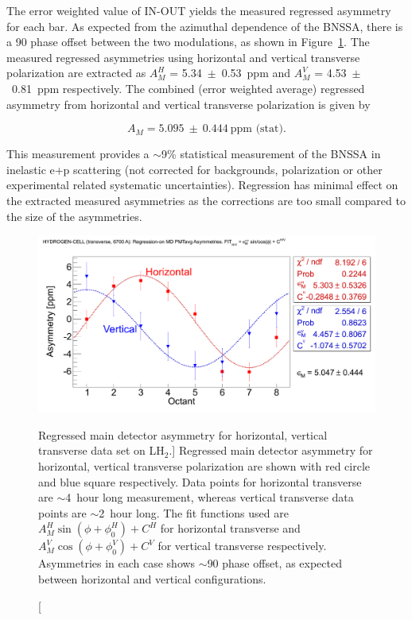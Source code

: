 The error weighted value of IN-OUT yields the measured regressed asymmetry for each bar. As expected from the azimuthal dependence of the BNSSA, there is a 90\degrees{} phase offset between the two modulations, as shown in Figure~\ref{fig:asymmetry_H2}. The measured regressed asymmetries using horizontal and vertical transverse polarization are extracted as $A_{M}^{H}$ = 5.34~$\pm$~0.53~ppm and  $A_{M}^{V}$ = 4.53~$\pm$~0.81~ppm respectively. The combined (error weighted average) regressed asymmetry from horizontal and vertical transverse polarization is given by

\begin{equation} \label{equ:asymmetryMeasured}
A_{M} = 5.095~\pm~0.444~\text{ppm (stat)}.
\end{equation}

This measurement provides a $\sim$9\% statistical measurement of the BNSSA in inelastic e+p scattering (not corrected for backgrounds, polarization or other experimental related systematic uncertainties). Regression has minimal effect on the extracted measured asymmetries as the corrections are too small compared to the size of the asymmetries.

\begin{figure}[!h]
	\begin{center}
	\includegraphics[width=15.0cm]{figures/asymmetry_H2}
	\end{center}
	\caption
	[Regressed main detector asymmetry for horizontal, vertical transverse data set on LH$_{2}$.]	
	{Regressed main detector asymmetry for horizontal, vertical transverse polarization are shown with red circle and blue square respectively. Data points for horizontal transverse are $\sim$4~hour long measurement, whereas vertical transverse data points are $\sim$2~hour long. The fit functions used are $A_{M}^{H} \sin(\phi + \phi_{0}^{H}) + C^{H}$ for horizontal transverse and $A_{M}^{V} \cos(\phi + \phi_{0}^{V}) + C^{V}$ for vertical transverse respectively. Asymmetries in each case shows $\sim$90\degrees{} phase offset, as expected between horizontal and vertical configurations.}
	\label{fig:asymmetry_H2}
\end{figure}

